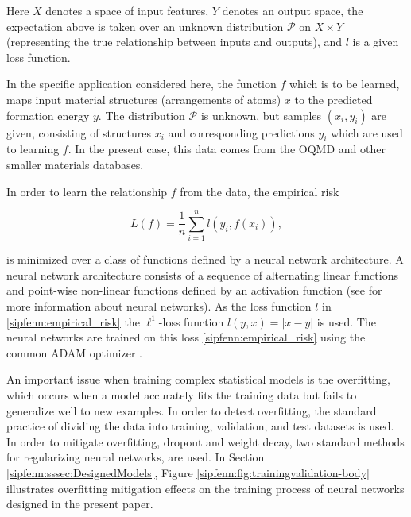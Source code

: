 Here $X$ denotes a space of input features, $Y$ denotes an output space, the expectation above is taken over an unknown distribution $\mathcal{P}$ on $X\times Y$ (representing the true relationship between inputs and outputs), and $l$ is a given loss function. 

In the specific application considered here, the function $f$ which is to be learned, maps input material structures (arrangements of atoms) $x$ to the predicted formation energy $y$. The distribution $\mathcal{P}$ is unknown, but samples $(x_i,y_i)$ are given, consisting of structures $x_i$ and corresponding predictions $y_i$ which are used to learning $f$. In the present case, this data comes from the OQMD and other smaller materials databases.


In order to learn the relationship $f$ from the data, the empirical risk

\begin{equation} \label{sipfenn:empirical_risk}
    L(f) = \frac{1}{n}\displaystyle\sum_{i=1}^n l(y_i, f(x_i)),
\end{equation}

is minimized over a class of functions defined by a neural network architecture. A neural network architecture consists of a sequence of alternating linear functions and point-wise non-linear functions defined by an activation function (see \cite{goodfellow2016deep} for more information about neural networks). As the loss function $l$ in \eqref{sipfenn:empirical_risk} the $\ell^1$-loss function $l(y,x) = |x-y|$ is used. The neural networks are trained on this loss \eqref{sipfenn:empirical_risk} using the common ADAM optimizer \cite{kingma2014adam}. 

An important issue when training complex statistical models is the overfitting, which occurs when a model accurately fits the training data but fails to generalize well to new examples. In order to detect overfitting, the standard practice of dividing the data into training, validation, and test datasets \cite{hastie2009elements} is used. In order to mitigate overfitting, dropout \cite{srivastava2014dropout} and weight decay, two standard methods for regularizing neural networks, are used. In Section \ref{sipfenn:sssec:DesignedModels}, Figure \ref{sipfenn:fig:trainingvalidation-body} illustrates overfitting mitigation effects on the training process of neural networks designed in the present paper.

